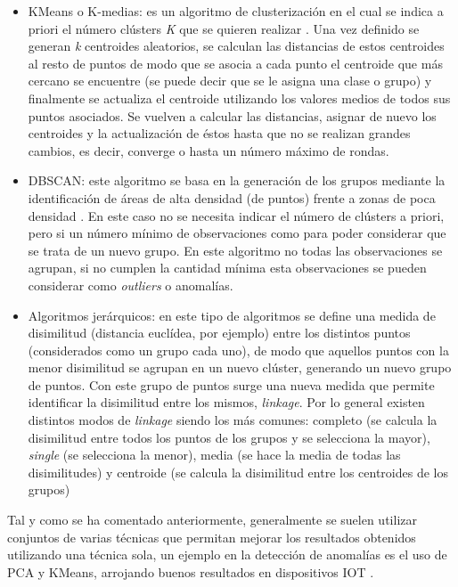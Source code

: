 \begin{itemize}
    \item KMeans o K-medias: es un algoritmo de clusterización en el cual se indica a priori el número clústers \textit{K} que se quieren realizar \cite{james2013introduction}. Una vez definido se generan \textit{k} centroides aleatorios, se calculan las distancias de estos centroides al resto de puntos de modo que se asocia a cada punto el centroide que más cercano se encuentre (se puede decir que se le asigna una clase o grupo) y finalmente se actualiza el centroide utilizando los valores medios de todos sus puntos asociados. Se vuelven a calcular las distancias, asignar de nuevo los centroides y la actualización de éstos hasta que no se realizan grandes cambios, es decir, converge o hasta un número máximo de rondas.
    \item DBSCAN: este algoritmo se basa en la generación de los grupos mediante la identificación de áreas de alta densidad (de puntos) frente a zonas de poca densidad \cite{ester1996density}. En este caso no se necesita indicar el número de clústers a  priori, pero si un número mínimo de observaciones como para poder considerar que se trata de un nuevo grupo. En este algoritmo no todas las observaciones se agrupan, si no cumplen la cantidad mínima esta observaciones se pueden considerar como \textit{outliers} o anomalías.
    \item Algoritmos jerárquicos: en este tipo de algoritmos se define una medida de disimilitud (distancia euclídea, por ejemplo) entre los distintos puntos (considerados como un grupo cada uno), de modo que aquellos puntos con la menor disimilitud se agrupan en un nuevo clúster, generando un nuevo grupo de puntos. Con este grupo de puntos surge una nueva medida que permite identificar la disimilitud entre los mismos, \textit{linkage}. Por lo general existen distintos modos de \textit{linkage} siendo los más comunes: completo (se calcula la disimilitud entre todos los puntos de los grupos y se selecciona la mayor), \textit{single} (se selecciona la menor), media (se hace la media de todas las disimilitudes) y centroide (se calcula la disimilitud entre los centroides de los grupos)
\end{itemize}

Tal y como se ha comentado anteriormente, generalmente se suelen utilizar conjuntos de varias técnicas que permitan mejorar los resultados obtenidos utilizando una técnica sola, un ejemplo en la detección de anomalías es el uso de PCA y KMeans, arrojando buenos resultados en dispositivos IOT \cite{pcakmeans}. 
